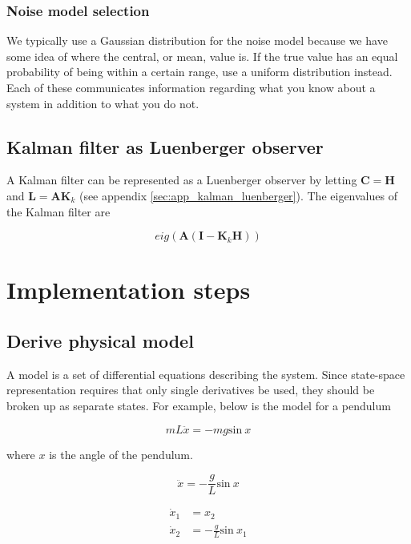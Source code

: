 \documentclass[10pt,conference,compsoc]{IEEEtran}
\newcommand{\mtx}[1] {\bm #1}
\begin{document}
\subsubsection{Noise model selection}

We typically use a Gaussian distribution for the noise model because we have
some idea of where the central, or mean, value is. If the true value has an
equal probability of being within a certain range, use a uniform distribution
instead. Each of these communicates information regarding what you know about a
system in addition to what you do not.

\subsection{Kalman filter as Luenberger observer}

A Kalman filter can be represented as a Luenberger observer by letting
$\mtx{C} = \mtx{H}$ and $\mtx{L} = \mtx{A} \mtx{K}_k$ (see appendix
\ref{sec:app_kalman_luenberger}). The eigenvalues of the Kalman filter are

\begin{equation}
  eig(\mtx{A}(\mtx{I} - \mtx{K}_k\mtx{H}))
\end{equation}

\section{Implementation steps}

\subsection{Derive physical model}

A model is a set of differential equations describing the system. Since
state-space representation requires that only single derivatives be used, they
should be broken up as separate states. For example, below is the model for a
pendulum

\begin{equation}
  mL\ddot{x} = -mg \mathrm{sin}~x
\end{equation}

where $x$ is the angle of the pendulum.

\begin{equation*}
  \ddot{x} = -\frac{g}{L} \mathrm{sin}~x
\end{equation*}

\begin{align*}
  \dot{x}_1 &= x_2 \\
  \dot{x}_2 &= -\frac{g}{L} \mathrm{sin}~x_1
\end{align*}
\end{document}
